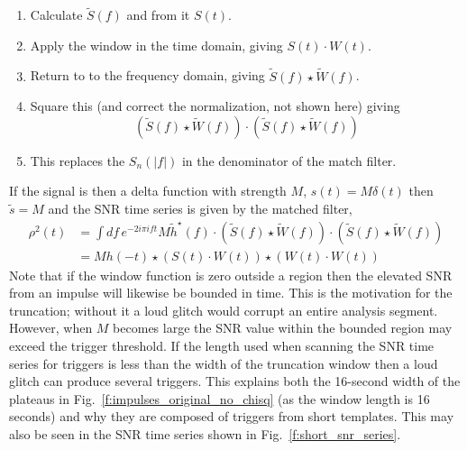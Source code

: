 \begin{enumerate}
\item Calculate $\tilde{S}(f)$ and from it $S(t)$.

\item Apply the window in the time domain, giving $S(t) \cdot W(t)$.

\item Return to to the frequency domain, giving $\tilde{S}(f) \star
\tilde{W}(f)$.

\item Square this (and correct the normalization, not shown here) giving 
%
\begin{equation*}
(\tilde{S}(f) \star \tilde{W}(f)) \cdot (\tilde{S}(f) \star \tilde{W}(f)) 
\end{equation*}
%
\item This replaces the $S_n(|f|)$ in the denominator of the match filter.
\end{enumerate}
%
If the signal is then a delta function with strength $M$, $s(t) = M
\delta(t)$ then $\tilde{s} = M$  and the SNR time series is 
given by the matched filter,
%
\begin{align*}
\rho^2(t) &= \int df\, e^{-2 i\pi i f t} M \tilde{h}^\star(f) \cdot
(\tilde{S}(f) \star \tilde{W}(f)) \cdot 
(\tilde{S}(f) \star \tilde{W}(f)) \\
&= M h(-t) \star
(S(t) \cdot W(t)) \star
(W(t) \cdot W(t))
\end{align*}
%
Note that if the window function is zero outside a region then the
elevated SNR from an impulse will likewise be bounded in time.  This
is the motivation for the truncation; without it a loud glitch would
corrupt an entire analysis segment.  However, when $M$ becomes large
the SNR value within the bounded region may exceed the trigger
threshold.  If the length used when scanning the SNR time series for
triggers is less than the width of the truncation window then a loud
glitch can produce several triggers.  This explains both the 16-second
width of the plateaus in Fig.~\ref{f:impulses_original_no_chisq} (as
the window length is 16 seconds) and why they are composed of triggers
from short templates.  This may also be seen in the SNR time series
shown in Fig.~\ref{f:short_snr_series}.

